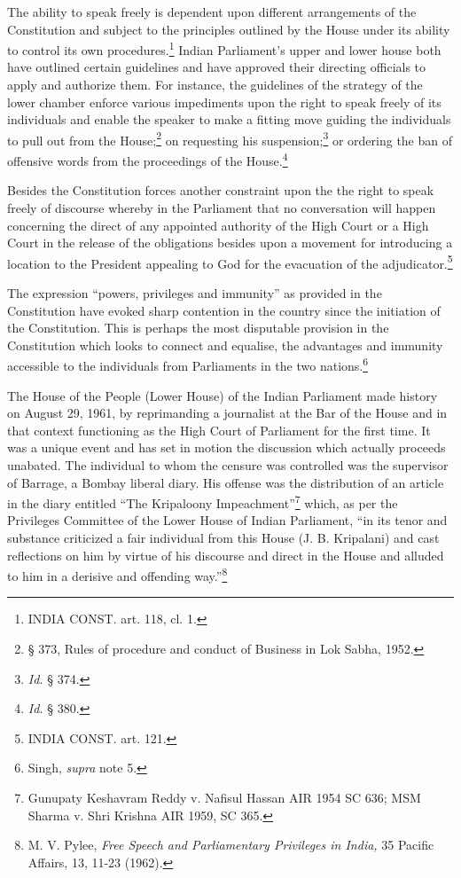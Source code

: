 \begin{multicols}{2}

\noi
The ability to speak freely is dependent upon different arrangements of the Constitution and
subject to the principles outlined by the House under its ability to control its own
procedures.\footnote{INDIA CONST. art. 118, cl. 1.} Indian Parliament’s upper and lower house both have outlined certain
guidelines and have approved their directing officials to apply and authorize them. For
instance, the guidelines of the strategy of the lower chamber enforce various impediments
upon the right to speak freely of its individuals and enable the speaker to make a fitting move
guiding the individuals to pull out from the House;\footnote{§ 373, Rules of procedure and conduct of Business in Lok Sabha, 1952.} on requesting his suspension;\footnote{\textit{Id.} § 374.} or ordering the ban of offensive words from the proceedings of the House.\footnote{\textit{Id.} § 380.}

\noi
Besides the Constitution forces another constraint upon the the right to speak freely of
discourse whereby in the Parliament that no conversation will happen concerning the direct
of any appointed authority of the High Court or a High Court in the release of the obligations
besides upon a movement for introducing a location to the President appealing to God for the
evacuation of the adjudicator.\footnote{INDIA CONST. art. 121.}

\noi
The expression “powers, privileges and immunity” as provided in the Constitution have
evoked sharp contention in the country since the initiation of the Constitution. This is perhaps
the most disputable provision in the Constitution which looks to connect and equalise, the
advantages and immunity accessible to the individuals from Parliaments in the two nations.\footnote{Singh, \textit{supra} note 5.}

\noi
The House of the People (Lower House) of the Indian Parliament made history on August 29,
1961, by reprimanding a journalist at the Bar of the House and in that context functioning as
the High Court of Parliament for the first time. It was a unique event and has set in motion
the discussion which actually proceeds unabated. The individual to whom the censure was
controlled was the supervisor of Barrage, a Bombay liberal diary. His offense was the
distribution of an article in the diary entitled “The Kripaloony Impeachment”\footnote{Gunupaty Keshavram Reddy v. Nafisul Hassan AIR 1954 SC 636; MSM Sharma v. Shri Krishna AIR 1959, SC 365.} which, as per
the Privileges Committee of the Lower House of Indian Parliament, “in its tenor and
substance criticized a fair individual from this House (J. B. Kripalani) and cast reflections on
him by virtue of his discourse and direct in the House and alluded to him in a derisive and
offending way.”\footnote{M. V. Pylee, \textit{Free Speech and Parliamentary Privileges in India,} 35 Pacific Affairs, 13, 11-23 (1962).}


\end{multicols}
